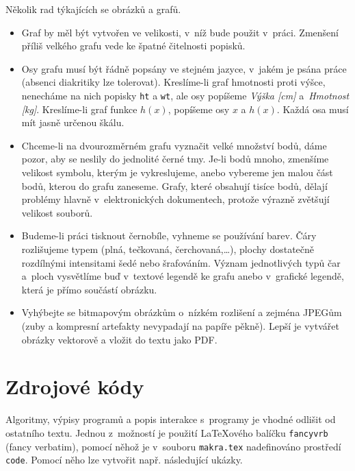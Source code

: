 Několik rad týkajících se obrázků a grafů.

\begin{itemize}
\item Graf by měl být vytvořen ve velikosti, v~níž bude použit
  v~práci. Zmenšení příliš velkého grafu vede ke špatné čitelnosti
  popisků.
\item Osy grafu musí být řádně popsány ve stejném jazyce, v~jakém je
  psána práce (absenci diakritiky lze tolerovat). Kreslíme-li graf
  hmotnosti proti výšce, nenecháme na nich popisky \texttt{ht} a
  \texttt{wt}, ale osy popíšeme \emph{Výška [cm]} a~\emph{Hmotnost
    [kg]}. Kreslíme-li graf funkce $h(x)$, popíšeme osy $x$ a $h(x)$.
  Každá osa musí mít jasně určenou škálu.
\item Chceme-li na dvourozměrném grafu vyznačit velké množství bodů,
  dáme pozor, aby se neslily do jednolité černé tmy. Je-li bodů mnoho,
  zmenšíme velikost symbolu, kterým je vykreslujeme, anebo vybereme
  jen malou část bodů, kterou do grafu zaneseme. Grafy, které obsahují
  tisíce bodů, dělají problémy hlavně v~elektronických dokumentech,
  protože výrazně zvětšují velikost souborů.
\item Budeme-li práci tisknout černobíle, vyhneme se používání barev.
  Čáry roz\-li\-šu\-je\-me typem (plná, tečkovaná, čerchovaná,\ldots), plochy
  dostatečně roz\-díl\-ný\-mi intensitami šedé nebo šrafováním. Význam
  jednotlivých typů čar a~ploch vysvětlíme buď v~textové legendě ke
  grafu anebo v~grafické legendě, která je přímo součástí obrázku.
\item Vyhýbejte se bitmapovým obrázkům o~nízkém rozlišení a zejména
  JPEGům (zuby a kompresní artefakty nevypadají na papíře pěkně).
  Lepší je vytvářet obrázky vektorově a vložit do textu jako PDF.
\end{itemize}


\section{Zdrojové kódy}
Algoritmy, výpisy programů a popis interakce s~programy je vhodné odlišit od ostatního textu. Jednou z~možností je použití {\LaTeX}o\-vé\-ho balíčku \texttt{fancyvrb} (fancy verbatim), pomocí něhož je v~souboru \texttt{makra.tex} nadefinováno prostředí \texttt{code}. Pomocí něho lze vytvořit např. následující ukázky.



